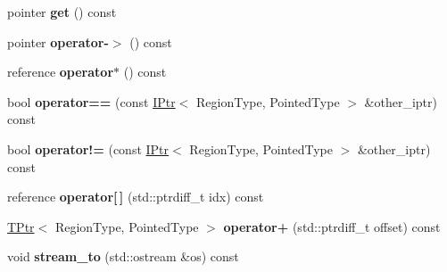 \begin{DoxyCompactItemize}
\item 
pointer {\bfseries get} () const \hypertarget{classalps_1_1BaseRelativePointer_1_1PPtr_a4a0ca4093873f2dab30e990cd8174dd7}{}\label{classalps_1_1BaseRelativePointer_1_1PPtr_a4a0ca4093873f2dab30e990cd8174dd7}

\item 
pointer {\bfseries operator-\/$>$} () const \hypertarget{classalps_1_1BaseRelativePointer_1_1PPtr_ac823159a9ea8a2f901ff061c59664565}{}\label{classalps_1_1BaseRelativePointer_1_1PPtr_ac823159a9ea8a2f901ff061c59664565}

\item 
reference {\bfseries operator$\ast$} () const \hypertarget{classalps_1_1BaseRelativePointer_1_1PPtr_a4cd8e0384027d714e3ceb5c217db38ad}{}\label{classalps_1_1BaseRelativePointer_1_1PPtr_a4cd8e0384027d714e3ceb5c217db38ad}

\item 
bool {\bfseries operator==} (const \hyperlink{classalps_1_1BaseRelativePointer_1_1IPtr}{I\+Ptr}$<$ Region\+Type, Pointed\+Type $>$ \&other\+\_\+iptr) const \hypertarget{classalps_1_1BaseRelativePointer_1_1PPtr_adbaccb816260a3431aaa33c12397e0c6}{}\label{classalps_1_1BaseRelativePointer_1_1PPtr_adbaccb816260a3431aaa33c12397e0c6}

\item 
bool {\bfseries operator!=} (const \hyperlink{classalps_1_1BaseRelativePointer_1_1IPtr}{I\+Ptr}$<$ Region\+Type, Pointed\+Type $>$ \&other\+\_\+iptr) const \hypertarget{classalps_1_1BaseRelativePointer_1_1PPtr_a20a5a643be92c5cd98ad2b3496831c33}{}\label{classalps_1_1BaseRelativePointer_1_1PPtr_a20a5a643be92c5cd98ad2b3496831c33}

\item 
reference {\bfseries operator\mbox{[}$\,$\mbox{]}} (std\+::ptrdiff\+\_\+t idx) const \hypertarget{classalps_1_1BaseRelativePointer_1_1PPtr_a7e32a2e734ef7725c125f24f73d82ce7}{}\label{classalps_1_1BaseRelativePointer_1_1PPtr_a7e32a2e734ef7725c125f24f73d82ce7}

\item 
\hyperlink{classalps_1_1BaseRelativePointer_1_1TPtr}{T\+Ptr}$<$ Region\+Type, Pointed\+Type $>$ {\bfseries operator+} (std\+::ptrdiff\+\_\+t offset) const \hypertarget{classalps_1_1BaseRelativePointer_1_1PPtr_a859680f5e1d4838dd30d09e8c17f3a71}{}\label{classalps_1_1BaseRelativePointer_1_1PPtr_a859680f5e1d4838dd30d09e8c17f3a71}

\item 
void {\bfseries stream\+\_\+to} (std\+::ostream \&os) const \hypertarget{classalps_1_1BaseRelativePointer_1_1PPtr_ac840656da125bdf6d480a5794e7d13ee}{}\label{classalps_1_1BaseRelativePointer_1_1PPtr_ac840656da125bdf6d480a5794e7d13ee}

\end{DoxyCompactItemize}
